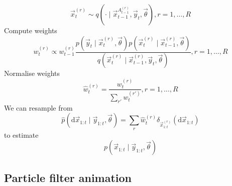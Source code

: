 \begin{algorithm}
\begin{algorithmic}[1]
                    \begin{equation}
                        \vec x_t^{(r)} \sim q\left(\cdot \mid \vec x_{t - 1}^{A_{t - 1}^{(r)}}, \vec y_t, \vec \theta\right), r = 1, \dotsc, R
                    \end{equation}
                \State Compute weights
                    \begin{equation}
                        w_t^{(r)} \propto w_{t - 1}^{(r)} \frac{p\left(\vec y_t \mid \vec x_t^{(r)}, \vec \theta\right) p\left(\vec x_t^{(r)} \mid \vec x_{t - 1}^{(r)}, \vec \theta \right)}{q\left(\vec x_t^{(r)} \mid \vec x_{t - 1}^{(r)}, \vec y_t, \vec \theta \right)}, r = 1, \dotsc, R
                    \end{equation}
                \State Normalise weights
                    \begin{equation}
                        \hat w_t^{(r)} = \frac{w_t^{(r)}}{\sum_{r'} w_t^{(r')}}, r = 1, \dotsc, R
                    \end{equation}
                \State We can resample from
                    \begin{equation}
                        \hat p(\mathrm d \vec x_{1:t} \mid \vec y_{1:t}, \vec \theta) = \sum_r \hat w_t^{(r)} \delta_{\vec x_{1:t}^{(r)}}(\mathrm d \vec x_{1:t})
                    \end{equation}
                    to estimate
                    \begin{equation}
                        p(\vec x_{1:t} \mid \vec y_{1:t}, \vec \theta)
                    \end{equation}
            \EndFor

        \end{algorithmic}
    \end{algorithm}

\subsection{Particle filter animation}

